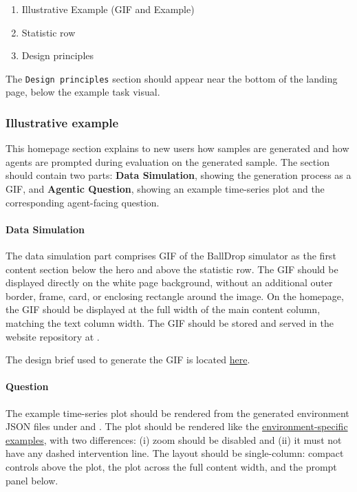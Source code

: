 \documentclass[11pt]{article}
\begin{document}
\begin{enumerate}
  \item Illustrative Example (GIF and Example)
  \item Statistic row
  \item Design principles
\end{enumerate}

The \texttt{Design principles} section should appear near the bottom of the landing page, below the example task visual.


\subsubsection*{Illustrative example}
This homepage section explains to new users how samples are generated and how agents are prompted during evaluation on the generated sample.
The section should contain two parts: \textbf{Data Simulation}, showing the generation process as a GIF, and \textbf{Agentic Question}, showing an example time-series plot and the corresponding agent-facing question.

\paragraph{Data Simulation}
The data simulation part comprises GIF of the BallDrop simulator as the first content section below the hero and above the statistic row.
The GIF should be displayed directly on the white page background, without an additional outer border, frame, card, or enclosing rectangle around the image.
On the homepage, the GIF should be displayed at the full width of the main content column, matching the text column width.
The GIF should be stored and served in the website repository at .

The design brief used to generate the GIF is located \hyperref[sec:website-ball-drop-gif-prompt]{here}.

\paragraph{Question}
The example time-series plot should be rendered from the generated environment JSON files under  and .
The plot should be rendered like the \hyperref[sec:website-environment-specific-page]{environment-specific examples}, with two differences: (i) zoom should be disabled and (ii) it must not have any dashed intervention line.
The layout should be single-column: compact controls above the plot, the plot across the full content width, and the prompt panel below.
\end{document}
